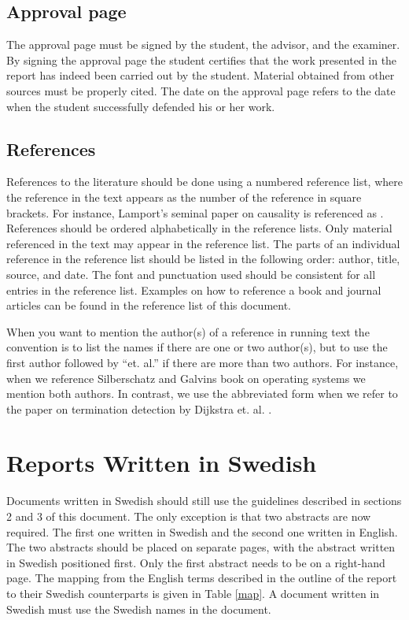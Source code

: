 \documentclass[12pt,twoside]{kau_report}
\begin{document}
\subsection{Approval page}
The approval page must be signed by the student, the
advisor, and the examiner. By signing the approval page the student
certifies that the work presented in the report has indeed been carried out
by the student. Material obtained from other sources must be properly
cited. The date on the approval page refers to the date when the
student successfully defended his or her work.

\subsection{References}
References to the literature should be done using a numbered
reference list, where the reference in the text appears as the number
of the reference in square brackets. For instance, Lamport's seminal
paper on causality is referenced as \cite{Lamport78}. References should
be ordered alphabetically in the reference lists. Only material
referenced in the text may appear in the reference list. The parts of
an individual reference in the reference list should be listed in
the following order: author, title, source, and date. The font and
punctuation used should be consistent for all entries in the reference
list. Examples on how to reference a book \cite{Silberschatz94} and
journal articles \cite{Lamport78,Dijkstra83} can be found in the
reference list of this document. 

When you want to mention the author(s) of a reference in running
text the convention is to list the names if there are one or two
author(s), but to use the first author followed by ``et. al.'' if there are
more than two authors. For instance, when we reference Silberschatz
and Galvins book on operating systems \cite{Silberschatz94} we mention
both authors. In contrast, we use the abbreviated form when we refer
to the paper on termination detection by Dijkstra
et. al. \cite{Dijkstra83}. 

\section{Reports Written in Swedish}
Documents written in Swedish should still use the guidelines described
in sections 2 and 3 of this document. The only exception is that two
abstracts are now required. The first one written in Swedish and the
second one written in English. The two abstracts should be placed on
separate pages, with the abstract written in Swedish positioned
first. Only the first abstract needs to be on a
right-hand page. 
The mapping from the English terms described in the outline of the
report to their Swedish counterparts is given in Table \ref{map}.
A document written in Swedish must use the Swedish names in the
document. 
 
\end{document}
